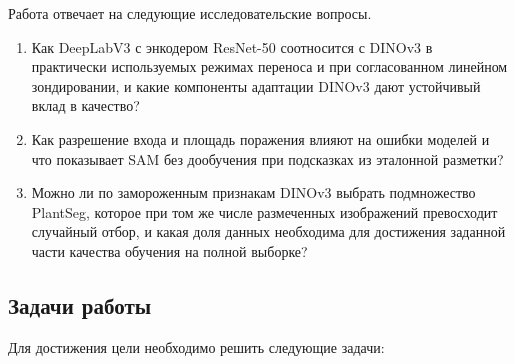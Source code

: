 \documentclass[a4paper,12pt]{extarticle}
\begin{document}
Работа отвечает на следующие исследовательские вопросы.

\begin{enumerate}[label=RQ\arabic*.]
  \item Как DeepLabV3 с энкодером ResNet-50 соотносится с DINOv3 в практически
  используемых режимах переноса и при согласованном линейном зондировании, и
  какие компоненты адаптации DINOv3 дают устойчивый вклад в качество?
  \item Как разрешение входа и площадь поражения влияют на ошибки моделей и
  что показывает SAM без дообучения при подсказках из эталонной разметки?
  \item Можно ли по замороженным признакам DINOv3 выбрать подмножество PlantSeg,
  которое при том же числе размеченных изображений превосходит случайный
  отбор, и какая доля данных необходима для достижения заданной части качества
  обучения на полной выборке?
\end{enumerate}

\subsection{Задачи работы}

Для достижения цели необходимо решить следующие задачи:
\end{document}
